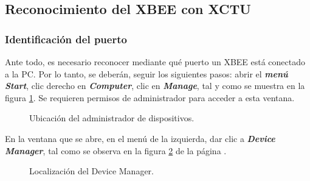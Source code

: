 \subsection{Reconocimiento del XBEE con XCTU}\label{subsec:Fine}
\subsubsection{Identificación del puerto}\label{subsubsec:Iden}
Ante todo, es necesario reconocer mediante qué puerto un XBEE está conectado a la PC. Por lo tanto, se deberán, seguir los siguientes pasos: abrir el \textit{\textbf{menú Start}}, clic derecho en \textit{\textbf{Computer}}, clic en \textit{\textbf{Manage}}, tal y como se muestra en la figura \ref{fig:Man}. Se requieren permisos de administrador para acceder a esta ventana.

\begin{figure}[H] %
\caption[1]{Ubicación del administrador de dispositivos.}
\label{fig:Man}
\end{figure}

En la ventana que se abre, en el menú de la izquierda, dar clic a \textit{\textbf{Device Manager}}, tal como se observa en la figura \ref{fig:DevM} de la página \pageref{fig:DevM}. 

\begin{figure}[H] %
\caption[1]{Localización del Device Manager.}
\label{fig:DevM}
\end{figure}

